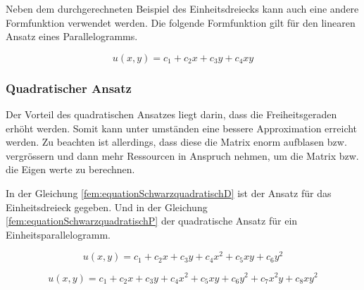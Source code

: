 Neben dem durchgerechneten Beispiel des Einheitsdreiecks kann auch eine andere Formfunktion verwendet werden. Die folgende Formfunktion gilt für den linearen Ansatz eines Parallelogramms.

\begin{equation}
	u(x,y) = c_1 + c_2 x + c_3 y + c_4 xy
\end{equation} 


\subsubsection{Quadratischer Ansatz
\label{fem:subsection:bonorum}}

Der Vorteil des quadratischen Ansatzes liegt darin, dass die Freiheitsgeraden erhöht werden. Somit kann unter umständen eine bessere Approximation erreicht werden.
Zu beachten ist allerdings, dass diese die Matrix enorm aufblasen bzw. vergrössern und dann mehr Ressourcen in Anspruch nehmen, um die Matrix bzw. die Eigen werte zu berechnen.

In der Gleichung \ref{fem:equationSchwarzquadratischD}  ist der Ansatz für das Einheitsdreieck gegeben. Und in der Gleichung \ref{fem:equationSchwarzquadratischP} der quadratische Ansatz für ein Einheitsparallelogramm.

\begin{equation}
	u(x,y) = c_1 + c_2 x + c_3 y + c_4 x^2 + c_5 xy + c_6 y^2
	\label{fem:equationSchwarzquadratischD}
\end{equation}

\begin{equation}
	u(x,y) = c_1 + c_2 x + c_3 y + c_4 x^2 + c_5 xy + c_6 y^2 + c_7 x^2y + c_8 xy^2
	\label{fem:equationSchwarzquadratischP}
\end{equation} 



